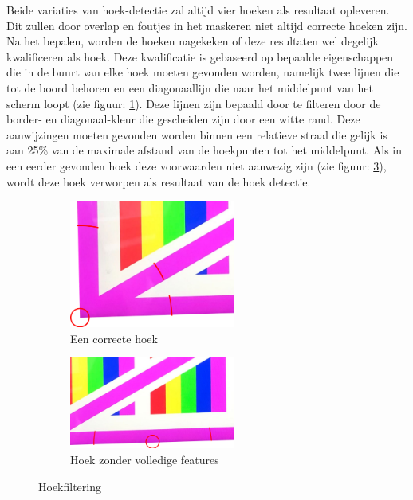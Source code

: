 Beide variaties van hoek-detectie zal altijd vier hoeken als resultaat opleveren. Dit zullen door overlap en foutjes in het maskeren niet altijd correcte hoeken zijn. Na het bepalen, worden de hoeken nagekeken of deze resultaten wel degelijk kwalificeren als hoek. Deze kwalificatie is gebaseerd op bepaalde eigenschappen die in de buurt van elke hoek moeten gevonden worden, namelijk twee lijnen die tot de boord behoren en een diagonaallijn die naar het middelpunt van het scherm loopt (zie figuur: \ref{fig:correcte hoek}). Deze lijnen zijn bepaald door te filteren door de border- en diagonaal-kleur die gescheiden zijn door een witte rand. Deze aanwijzingen moeten gevonden worden binnen een relatieve straal die gelijk is aan 25\% van de maximale afstand van de hoekpunten tot het middelpunt. Als in een eerder gevonden hoek deze voorwaarden niet aanwezig zijn (zie figuur: \ref{fig:foute hoek}), wordt deze hoek verworpen als resultaat van de hoek detectie.

\begin{figure}[h] 
\centering
\begin{subfigure}{0.5\textwidth}
\centering
\includegraphics[width=0.6\textwidth]{img/correctCorner.png}
\caption{Een correcte hoek}
\label{fig:correcte hoek}
\end{subfigure}%
\begin{subfigure}{0.5\textwidth}
\centering
\includegraphics[width=0.6\textwidth]{img/notACorner.png}
\caption{Hoek zonder volledige features}
\label{fig:foute hoek}
\end{subfigure}
\caption{Hoekfiltering}
\end{figure}